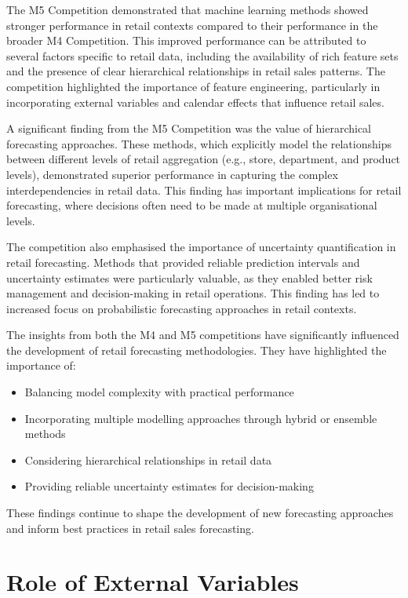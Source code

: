 \documentclass[12pt,a4paper]{report}
\begin{document}
The M5 Competition demonstrated that machine learning methods showed stronger performance in retail contexts compared to their performance in the broader M4 Competition. This improved performance can be attributed to several factors specific to retail data, including the availability of rich feature sets and the presence of clear hierarchical relationships in retail sales patterns. The competition highlighted the importance of feature engineering, particularly in incorporating external variables and calendar effects that influence retail sales.

A significant finding from the M5 Competition was the value of hierarchical forecasting approaches. These methods, which explicitly model the relationships between different levels of retail aggregation (e.g., store, department, and product levels), demonstrated superior performance in capturing the complex interdependencies in retail data. This finding has important implications for retail forecasting, where decisions often need to be made at multiple organisational levels.

The competition also emphasised the importance of uncertainty quantification in retail forecasting. Methods that provided reliable prediction intervals and uncertainty estimates were particularly valuable, as they enabled better risk management and decision-making in retail operations. This finding has led to increased focus on probabilistic forecasting approaches in retail contexts.

The insights from both the M4 and M5 competitions have significantly influenced the development of retail forecasting methodologies. They have highlighted the importance of:
\begin{itemize}
    \item Balancing model complexity with practical performance
    \item Incorporating multiple modelling approaches through hybrid or ensemble methods
    \item Considering hierarchical relationships in retail data
    \item Providing reliable uncertainty estimates for decision-making
\end{itemize}

These findings continue to shape the development of new forecasting approaches and inform best practices in retail sales forecasting.

\section{Role of External Variables}
\end{document}
